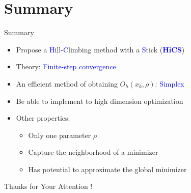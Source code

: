 \documentclass{beamer}
\begin{document}
\section{Summary}
\begin{frame}{Summary}
	\begin{itemize}
		\item Propose a
\textcolor{blue}{Hi}ll-\textcolor{blue}{C}limbing
	method with a \textcolor{blue}{S}tick (\textcolor{blue}{\textbf{HiCS}})
		\item Theory: \textcolor{blue}{Finite-step convergence} 
		\item An efficient method of obtaining $O_h(x_k, \rho)$: \textcolor{blue}{Simplex	}
		\item Be able to implement to high dimension optimization
		\item Other properties:
			\begin{itemize}
				\item Only one parameter $\rho$ 
				\item Capture the neighborhood of a minimizer
				\item Has potential to approximate the global minimizer
			\end{itemize}
	\end{itemize}
\end{frame}

\begin{frame}
	\begin{centering}
	  \Huge Thanks for Your Attention ! \par
	\end{centering}
\end{frame}

%
\end{document}

